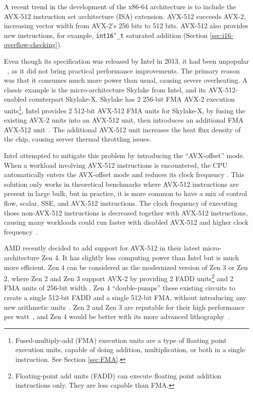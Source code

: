 \documentclass[logo,bsc,singlespacing,parskip]{infthesis}
\newcommand{\dtshort}{\texttt{int16\char`_t}}
\begin{document}
A recent trend in the development of the x86-64 architecture is to include the AVX-512 instruction set architecture (ISA) extension. AVX-512 succeeds AVX-2, increasing vector width from AVX-2’s 256 bits to 512 bits. AVX-512 also provides new instructions, for example, \dtshort{} saturated addition (Section \ref{sec:i16-overflow-checking}).


Even though its specification was released by Intel in 2013, it had been unpopular ~\cite{linusHopeAvx512Die}, as it did not bring practical performance improvements. The primary reason was that it consumes much more power than usual, causing severe overheating. A classic example is the micro-architecture Skylake from Intel, and its AVX-512-enabled counterpart Skylake-X. Skylake has 2 256-bit FMA AVX-2 execution units\footnote{Fused-multiply-add (FMA) execution units are a type of floating point execution units, capable of doing addition, multiplication, or both in a single instruction. See Section \ref{sec:FMA}.}. Intel provides 2 512-bit AVX-512 FMA units for Skylake-X, by fusing the existing AVX-2 units into an AVX-512 unit, then introduces an additional FMA AVX-512 unit~\cite{SLK-X}. The additional AVX-512 unit increases the heat flux density of the chip, causing server thermal throttling issues. 

Intel attempted to mitigate this problem by introducing the ``AVX-offset'' mode. When a workload involving AVX-512 instructions is encountered, the CPU automatically enters the AVX-offset mode and reduces its clock frequency \cite{AVX-offset}. This solution only works in theoretical benchmarks where AVX-512 instructions are present in large bulk, but in practice, it is more common to have a mix of control flow, scalar, SSE, and AVX-512 instructions. The clock frequency of executing those non-AVX-512 instructions is decreased together with AVX-512 instructions, causing many workloads could run faster with disabled AVX-512 and higher clock frequency~\cite{Zen4Critique}. 


AMD recently decided to add support for AVX-512 in their latest micro-architecture Zen 4. It has slightly less computing power than Intel but is much more efficient. Zen 4 can be considered as the modernized version of Zen 3 or Zen 2, where Zen 2 and Zen 3 support AVX-2  by providing 2 FADD units\footnote{Floating-point add units (FADD) can execute floating point addition instructions only. They are less capable than FMA.} and 2 FMA units of 256-bit width \cite{Zen2ChipWiki}. Zen 4 ``double-pumps'' these existing circuits to create a single 512-bit FADD and a single 512-bit FMA, without introducing any new arithmetic units~\cite{Zen4Critique}. Zen 2 and Zen 3 are reputable for their high performance per watt~\cite{ZenPerfPerWatt}, and Zen 4 would be better with its more advanced lithography~\cite{Zen4Critique}.
\end{document}

